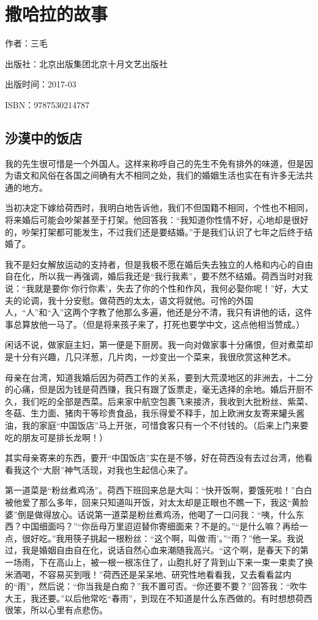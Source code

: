 
\section{撒哈拉的故事}

\par 作者：三毛
\par 出版社：北京出版集团北京十月文艺出版社
\par 出版时间：2017-03
\par ISBN：9787530214787

\subsection{沙漠中的饭店}
\par 我的先生很可惜是一个外国人。这样来称呼自己的先生不免有排外的味道，但是因为语文和风俗在各国之间确有大不相同之处，我们的婚姻生活也实在有许多无法共通的地方。
\par 当初决定下嫁给荷西时，我明白地告诉他，我们不但国籍不相同，个性也不相同，将来婚后可能会吵架甚至于打架。他回答我：“我知道你性情不好，心地却是很好的，吵架打架都可能发生，不过我们还是要结婚。”于是我们认识了七年之后终于结婚了。
\par 我不是妇女解放运动的支持者，但是我极不愿在婚后失去独立的人格和内心的自由自在化，所以我一再强调，婚后我还是“我行我素”，要不然不结婚。荷西当时对我说：“我就是要你‘你行你素’，失去了你的个性和作风，我何必娶你呢！”好，大丈夫的论调，我十分安慰。做荷西的太太，语文将就他。可怜的外国人，“人”和“入”这两个字教了他那么多遍，他还是分不清，我只有讲他的话，这件事总算放他一马了。（但是将来孩子来了，打死也要学中文，这点他相当赞成。）
\par 闲话不说，做家庭主妇，第一便是下厨房。我一向对做家事十分痛恨，但对煮菜却是十分有兴趣，几只洋葱，几片肉，一炒变出一个菜来，我很欣赏这种艺术。
\par 母亲在台湾，知道我婚后因为荷西工作的关系，要到大荒漠地区的非洲去，十二分的心痛，但是因为钱是荷西赚，我只有跟了饭票走，毫无选择的余地。婚后开厨不久，我们吃的全部是西菜。后来家中航空包裹飞来接济，我收到大批粉丝、紫菜、冬菇、生力面、猪肉干等珍贵食品，我乐得爱不释手，加上欧洲女友寄来罐头酱油，我的家庭“中国饭店”马上开张，可惜食客只有一个不付钱的。（后来上门来要吃的朋友可是排长龙啊！）
\par 其实母亲寄来的东西，要开“中国饭店”实在是不够，好在荷西没有去过台湾，他看看我这个“大厨”神气活现，对我也生起信心来了。
\par 第一道菜是“粉丝煮鸡汤”。荷西下班回来总是大叫：“快开饭啊，要饿死啦！”白白被他爱了那么多年，回来只知道叫开饭，对太太却是正眼也不瞧一下，我这“黄脸婆”倒是做得放心。话说第一道菜是粉丝煮鸡汤，他喝了一口问我：“咦，什么东西？中国细面吗？”“你岳母万里迢迢替你寄细面来？不是的。”“是什么嘛？再给一点，很好吃。”我用筷子挑起一根粉丝：“这个啊，叫做‘雨’。”“雨？”他一呆。我说过，我是婚姻自由自在化，说话自然心血来潮随我高兴。“这个啊，是春天下的第一场雨，下在高山上，被一根一根冻住了，山胞扎好了背到山下来一束一束卖了换米酒喝，不容易买到哦！”荷西还是呆呆地、研究性地看看我，又去看看盆内的“雨”，然后说：“你当我是白痴？”我不置可否。“你还要不要？”回答我：“吹牛大王，我还要。”以后他常吃“春雨”，到现在不知道是什么东西做的。有时想想荷西很笨，所以心里有点悲伤。
